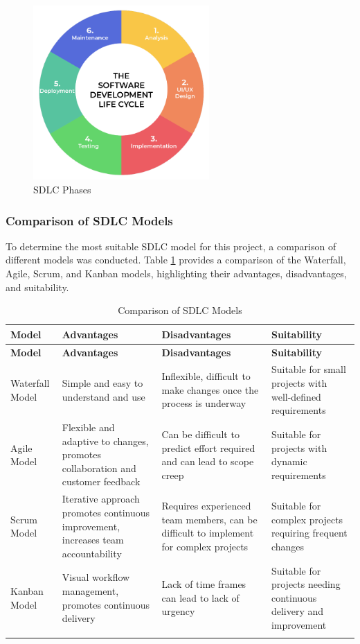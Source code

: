 \begin{figure}[H]
  \centering
  \includegraphics[width=0.6\textwidth]{Images/sdlc.png}
  \caption{SDLC Phases}
  \label{fig:SDLC Phases}
\end{figure}

\subsubsection{Comparison of SDLC Models}
To determine the most suitable SDLC model for this project, a comparison of different models was conducted. Table \ref{tab:sdlc_models} provides a comparison of the Waterfall, Agile, Scrum, and Kanban models, highlighting their advantages, disadvantages, and suitability.

\begin{longtable}{|m{3cm}|m{4cm}|m{4cm}|m{4cm}|}
\hline
\textbf{Model} & \textbf{Advantages} & \textbf{Disadvantages} & \textbf{Suitability} \\
\hline
\endfirsthead
\hline
\textbf{Model} & \textbf{Advantages} & \textbf{Disadvantages} & \textbf{Suitability} \\
\hline
\endhead
Waterfall Model & Simple and easy to understand and use & Inflexible, difficult to make changes once the process is underway & Suitable for small projects with well-defined requirements \\
\hline
Agile Model & Flexible and adaptive to changes, promotes collaboration and customer feedback & Can be difficult to predict effort required and can lead to scope creep & Suitable for projects with dynamic requirements \\
\hline
Scrum Model & Iterative approach promotes continuous improvement, increases team accountability & Requires experienced team members, can be difficult to implement for complex projects & Suitable for complex projects requiring frequent changes \\
\hline
Kanban Model & Visual workflow management, promotes continuous delivery & Lack of time frames can lead to lack of urgency & Suitable for projects needing continuous delivery and improvement \\
\hline
\caption{Comparison of SDLC Models}
\label{tab:sdlc_models}
\end{longtable}

